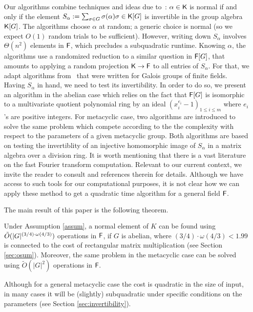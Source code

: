 Our algorithms combine techniques and ideas due
to~\cite{GatGie90,KalSho98}: $\alpha \in {\mathsf{K}}$ is normal if and only
if the element $S_\alpha := \sum_{\sigma \in G} \sigma(\alpha)\sigma
\in {\mathsf{K}}[G]$ is invertible in the group algebra ${\mathsf{K}}[G]$. The algorithms
choose $\alpha$ at random; a generic choice is normal (so we expect
$O(1)$ random trials to be sufficient). However, writing down
$S_\alpha$ involves $\Theta(n^2)$ elements in ${\mathsf{F}}$, which precludes a
subquadratic runtime. Knowing $\alpha$, the algorithms use a
randomized reduction to a similar question in ${\mathsf{F}}[G]$, that amounts to
applying a random projection ${\mathsf{K}}\to{\mathsf{F}}$ to all entries of $S_\alpha$.
For that, we adapt algorithms from~\cite{KalSho98} that were written
for Galois groups of finite fields. Having $S_\alpha$ in hand, we need
to test its invertibility. In order to do so, we present an algorithm 
in the abelian case which relies on the fact that ${\mathsf{F}}[G]$ is isomorphic 
to a multivariate quotient polynomial ring by an ideal $(x^{e_i}_i-1)_{1 \leq i \leq m}$
where $e_i$'s are positive integers. For metacyclic case, two algorithms
are introduced to solve the same problem which compete according to the 
the complexity with respect to the parameters of a given metacyclic group.
Both algorithms are based on testing the invertiblity of an injective
homomorphic image of $S_\alpha$ in a matrix algebra over a division ring.
It is worth mentioning that there is a vast literature on the fast Fourier
transform computation.  Relevant to our current context, we invite the
reader to consult \cite{ClaMu04,MaRockWol18} and references therein for details.
Although we have access to such tools for 
our computational purposes, it is not clear how we can apply these method 
to get a quadratic time algorithm for a general field ${\mathsf{F}}$.

The main result of this paper is the following theorem.

\begin{theorem}\label{thm:main}
  Under Assumption \ref{assum}, a normal element of $K$ can be found using
  $\tilde{O}(\vert G \vert ^{(3/4)\cdot \omega(4/3)})$ operations in ${\mathsf{F}}$, if $G$ is abelian, where
  $(3/4)\cdot\omega(4/3)<1.99$ is connected to the cost of rectangular
  matrix multiplication (see Section \ref{sec:osum}).  Moreover, the same
  problem in the metacyclic case can be solved using
  $\tilde{O}(\vert G \vert^2)$ operations in ${\mathsf{F}}$.
\end{theorem}

Although for a general metacyclic case the cost is quadratic in the 
size of input, in many cases it will be (slightly) subquadratic under specific 
conditions on the parameters (see Section \ref{sec:invertibility}).

